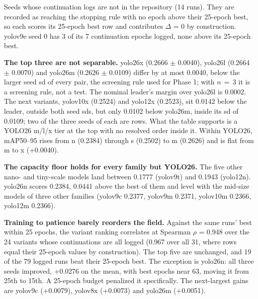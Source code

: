 \documentclass[journal,onecolumn]{IEEEtran}
\begin{document}
\begin{table}[htbp]
\par\smallskip\raggedright\footnotesize \textdagger{} Seeds whose continuation logs are not in the repository (14 runs). They are recorded as reaching the stopping rule with no epoch above their 25-epoch best, so each scores its 25-epoch best row and contributes $\Delta$ = 0 by construction. yolov9e seed 0 has 3 of its 7 continuation epochs logged, none above its 25-epoch best.
\end{table}
\textbf{The top three are not separable.} yolo26x (0.2666 $\pm$ 0.0040), yolo26l (0.2664 $\pm$ 0.0070) and yolo26m (0.2626 $\pm$ 0.0109) differ by at most 0.0040, below the larger seed sd of every pair, the screening rule used for Phase 1; with $n\,{=}\,3$ it is a screening rule, not a test. The nominal leader's margin over yolo26l is 0.0002. The next variants, yolov10x (0.2524) and yolo12x (0.2523), sit 0.0142 below the leader, outside both seed sds, but only 0.0102 below yolo26m, inside its sd of 0.0109; two of the three seeds of each are \textdagger{} rows. What the table supports is a YOLO26 m/l/x tier at the top with no resolved order inside it. Within YOLO26, mAP50--95 rises from n (0.2384) through s (0.2502) to m (0.2626) and is flat from m to x (+0.0040).

\textbf{The capacity floor holds for every family but YOLO26.} The five other nano- and tiny-scale models land between 0.1777 (yolov9t) and 0.1943 (yolo12n). yolo26n scores 0.2384, 0.0441 above the best of them and level with the mid-size models of three other families (yolov9c 0.2377, yolov9m 0.2371, yolov10m 0.2366, yolo12m 0.2366).

\textbf{Training to patience barely reorders the field.} Against the same runs' best within 25 epochs, the variant ranking correlates at Spearman $\rho$ = 0.948 over the 24 variants whose continuations are all logged (0.967 over all 31, where \textdagger{} rows equal their 25-epoch values by construction). The top five are unchanged, and 19 of the 79 logged runs beat their 25-epoch best. The exception is yolo26n: all three seeds improved, +0.0276 on the mean, with best epochs near 63, moving it from 25th to 15th. A 25-epoch budget penalized it specifically. The next-largest gains are yolov9c (+0.0079), yolov8x (+0.0073) and yolo26m (+0.0051).
\end{document}
